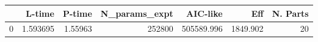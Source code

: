 \begin{tabular}{lrrrrrr}
\toprule
{} &    L-time &   P-time &  N\_params\_expt &    AIC-like &       Eff &  N. Parts \\
\midrule
0 &  1.593695 &  1.55963 &         252800 &  505589.996 &  1849.902 &        20 \\
\bottomrule
\end{tabular}

